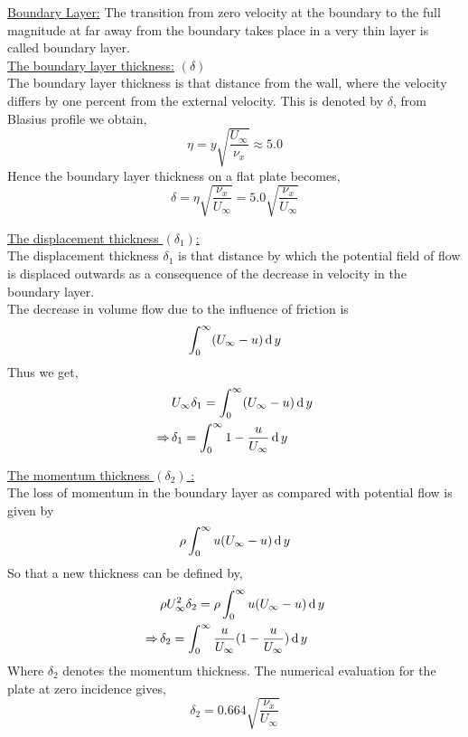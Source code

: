 \documentclass[../main-sheet.tex]{subfiles}
\begin{document}
\begin{soln}
    \underline{Boundary Layer:} The transition from zero velocity at the boundary to the full magnitude at far away from the boundary takes place in a very thin layer is called boundary layer.\\

    \underline{The boundary layer thickness:} \((\delta)\)\\
    The boundary layer thickness is that distance from the wall, where the velocity differs by one percent from the external velocity. This is denoted by \(\delta\), from Blasius profile we obtain,
    \[\eta=y\sqrt{\frac{U_\infty}{\nu_x}} \approx 5.0\]
    Hence the boundary layer thickness on a flat plate becomes,
    \[\delta=\eta\sqrt{\frac{\nu_x }{U_\infty}}=5.0\sqrt{\frac{\nu_x }{U_\infty}}\]

    \underline{The displacement thickness \((\delta_1)\):}\\
    The displacement thickness \(\delta_1\) is that distance by which the potential field of flow is displaced outwards as a consequence of the decrease in velocity in the boundary layer.\\
    The decrease in volume flow due to the influence of friction is
    \[\int_0^\infty (U_\infty-u )\,\mathrm{d}\, y\]
    Thus we get, 
    \begin{align*}
        & U_\infty \delta_1=\int_0^\infty (U_\infty-u )\,\mathrm{d}\, y\\
        \Rightarrow\,& \delta_1=\int_0^\infty 1-\frac{u}{U_\infty } \,\mathrm{d}\, y
    \end{align*}

    \underline{The momentum thickness \((\delta_2)\) :}\\
    The loss of momentum in the boundary layer as compared with potential flow is given by
    \[\rho\int_{0}^{\infty}u(U_\infty-u )\,\mathrm{d}\, y\]
    So that a new thickness can be defined by,
    \begin{align*}
        &\rho U_\infty^2 \delta_2 =\rho\int_{0}^{\infty}u(U_\infty-u )\,\mathrm{d}\, y\\
        \Rightarrow\,&\delta_2 =\int_{0}^{\infty}\frac{u}{U_\infty}(1-\frac{u}{U_\infty})\,\mathrm{d}\, y
    \end{align*}
    Where \(\delta_2\) denotes the momentum thickness. The numerical evaluation for the plate at zero incidence gives,
    \[\delta_2=0.664\sqrt{\frac{\nu_x }{U_\infty}}\]
    

\end{soln}
\end{document}
